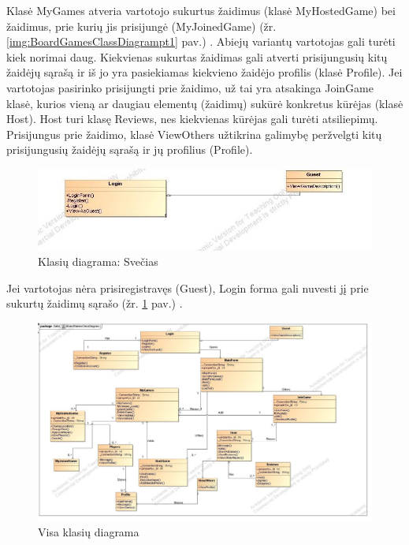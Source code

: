 \documentclass{VUMIFPSkursinis}
\begin{document}
			Klasė MyGames atveria vartotojo sukurtus žaidimus (klasė MyHostedGame) bei žaidimus, prie kurių jis prisijungė (MyJoinedGame) (žr. \ref{img:BoardGamesClassDiagrampt1} pav.) . Abiejų variantų vartotojas gali turėti kiek norimai daug. Kiekvienas sukurtas žaidimas gali atverti prisijungusių kitų žaidėjų sąrašą ir iš jo yra pasiekiamas kiekvieno žaidėjo profilis (klasė Profile). Jei vartotojas pasirinko prisijungti prie žaidimo, už tai yra atsakinga JoinGame klasė, kurios vieną ar daugiau elementų (žaidimų) sukūrė konkretus kūrėjas (klasė Host). Host turi klasę Reviews, nes kiekvienas kūrėjas gali turėti atsiliepimų. Prisijungus prie žaidimo, klasė ViewOthers užtikrina galimybę peržvelgti kitų prisijungusių žaidėjų sąrašą ir jų profilius (Profile).
			\begin{figure}[H]
				\centering
				\includegraphics[scale=0.5]{img/BoardGamesClassDiagrampt2}
				\caption{Klasių diagrama: Svečias}
				\label{img:BoardGamesClassDiagrampt2}
			\end{figure}
			Jei vartotojas nėra prisiregistravęs (Guest), Login forma gali nuvesti jį prie sukurtų žaidimų sąrašo (žr. \ref{img:BoardGamesClassDiagrampt2} pav.) .
			\begin{figure}[H]
				\centering
				\includegraphics[scale=0.4]{img/BoardGamesClassDiagramFull}
				\caption{Visa klasių diagrama}
				\label{img:BoardGamesClassDiagramFull}
			\end{figure}
\end{document}
